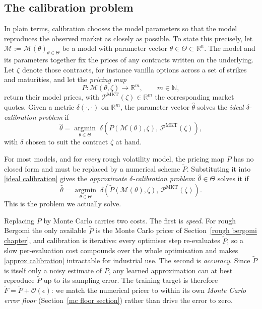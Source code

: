 \documentclass[12pt,a4paper]{article}
\theoremstyle{remark} \newtheorem{remark}[theorem]{Remark}
\begin{document}
\subsection{The calibration problem}\label{calibration problem section}
In plain terms, calibration chooses the model parameters so that the model reproduces the observed market as closely as possible. To state this precisely, let $\mathcal M:=\mathcal M(\theta)_{\theta\in\Theta}$ be a model with parameter vector $\theta\in\Theta\subset\mathbb R^n$. The model and its parameters together fix the prices of any contracts written on the underlying. Let $\zeta$ denote those contracts, for instance vanilla options across a set of strikes and maturities, and let the \emph{pricing map}
\[
P:\mathcal M(\theta,\zeta)\to\mathbb R^m,\qquad m\in\mathbb N,
\]
return their model prices, with $\mathcal P^{\mathrm{MKT}}(\zeta)\in\mathbb R^m$ the corresponding market quotes. Given a metric $\delta(\cdot,\cdot)$ on $\mathbb R^m$, the parameter vector $\hat\theta$ solves the \emph{ideal $\delta$-calibration problem} if
\begin{equation}\label{ideal calibration}
\hat\theta=\operatorname*{argmin}_{\theta\in\Theta}\;\delta\!\left(P(\mathcal M(\theta),\zeta),\,\mathcal P^{\mathrm{MKT}}(\zeta)\right),
\end{equation}
with $\delta$ chosen to suit the contract $\zeta$ at hand.

For most models, and for \emph{every} rough volatility model, the pricing map $P$ has no closed form and must be replaced by a numerical scheme $\widetilde P$. Substituting it into \eqref{ideal calibration} gives the \emph{approximate $\delta$-calibration problem}: $\hat\theta\in\Theta$ solves it if
\begin{equation}\label{approx calibration}
\hat\theta=\operatorname*{argmin}_{\theta\in\Theta}\;\delta\!\left(\widetilde P(\mathcal M(\theta),\zeta),\,\mathcal P^{\mathrm{MKT}}(\zeta)\right).
\end{equation}
This is the problem we actually solve.

Replacing $P$ by Monte Carlo carries two costs. The first is \emph{speed}. For rough Bergomi the only available $\widetilde P$ is the Monte Carlo pricer of Section~\ref{rough bergomi chapter}, and calibration is iterative: every optimiser step re-evaluates $\widetilde P$, so a slow per-evaluation cost compounds over the whole optimisation and makes \eqref{approx calibration} intractable for industrial use. The second is \emph{accuracy}. Since $\widetilde P$ is itself only a noisy estimate of $P$, any learned approximation can at best reproduce $\widetilde P$ up to its sampling error. The training target is therefore $\widetilde F=\widetilde P+\mathcal O(\epsilon)$: we match the numerical pricer to within its own \emph{Monte Carlo error floor} (Section~\ref{mc floor section}) rather than drive the error to zero.
\end{document}
